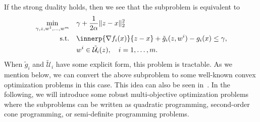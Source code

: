 \documentclass[../../main]{subfiles}
\begin{document}
If the strong duality holds, then we see that the subproblem  is equivalent to
\begin{equation} \label{eq:subproblem}
    \begin{aligned}
        \min_{\gamma, z, w^1, \dots, w^m} \quad & \gamma + \frac{1}{2 \alpha} \norm{z - x}_2^2                               \\
        \st    \quad                            & \innerp{\nabla f_i(x)}{z - x} + \tilde{g}_i (z, w^i) - g_i(x) \leq \gamma, \\
                                                & w^i \in \tilde{\mathcal{U}}_i (z), \quad i = 1,\ldots,m .
    \end{aligned}
\end{equation}
When $\tilde{g}_i$ and $\tilde{\mathcal{U}}_i$ have some explicit form, this problem is tractable.
As we mention below, we can convert the above subproblem to some well-known convex optimization problems in this case.
This idea can also be seen in~\cite{Ben-tal1998}.
In the following, we will introduce some robust multi-objective optimization problems where the subproblems can be written as quadratic programming, second-order cone programming, or semi-definite programming problems.






\end{document}
